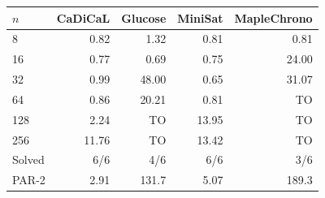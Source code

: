 \begin{tabular}{lrrrr}
\toprule
$n$ & CaDiCaL & Glucose & MiniSat & MapleChrono \\
\midrule
8 & 0.82 & 1.32 & 0.81 & 0.81 \\
16 & 0.77 & 0.69 & 0.75 & 24.00 \\
32 & 0.99 & 48.00 & 0.65 & 31.07 \\
64 & 0.86 & 20.21 & 0.81 & TO \\
128 & 2.24 & TO & 13.95 & TO \\
256 & 11.76 & TO & 13.42 & TO \\
Solved & 6/6 & 4/6 & 6/6 & 3/6 \\
PAR-2 & 2.91 & 131.7 & 5.07 & 189.3 \\
\bottomrule
\end{tabular}
